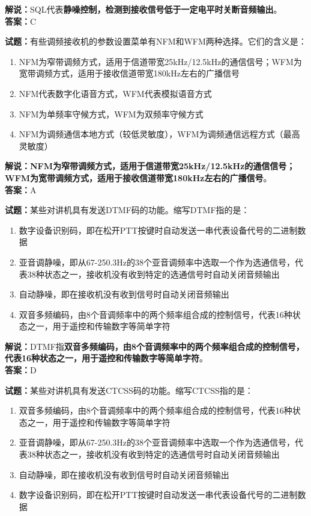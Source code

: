 \documentclass{ctexbook}
\begin{document}
\noindent\textbf{解说：}SQL代表\textbf{静噪控制，检测到接收信号低于一定电平时关断音频输出}。\\\noindent\textbf{答案：}C


\bigskip


\noindent\textbf{试题：}有些调频接收机的参数设置菜单有NFM和WFM两种选择。它们的含义是：

\begin{enumerate}[leftmargin=3em]
	\item NFM为窄带调频方式，适用于信道带宽25kHz/12.5kHz的通信信号；WFM为宽带调频方式，适用于接收信道带宽180kHz左右的广播信号
	\item NFM代表数字化语音方式，WFM代表模拟语音方式
	\item NFM为单频率守候方式，WFM为双频率守候方式
	\item NFM为调频通信本地方式（较低灵敏度），WFM为调频通信远程方式（最高灵敏度）
\end{enumerate}

\noindent\textbf{解说：NFM为窄带调频方式，适用于信道带宽25kHz/12.5kHz的通信信号；WFM为宽带调频方式，适用于接收信道带宽180kHz左右的广播信号}。\\\noindent\textbf{答案：}A


\bigskip


\noindent\textbf{试题：}某些对讲机具有发送DTMF码的功能。缩写DTMF指的是：

\begin{enumerate}[leftmargin=3em]
	\item 数字设备识别码，即在松开PTT按键时自动发送一串代表设备代号的二进制数据
	\item 亚音调静噪，即从67-250.3Hz的38个亚音调频率中选取一个作为选通信号，代表38种状态之一，接收机没有收到特定的选通信号时自动关闭音频输出	
	\item 自动静噪，即在接收机没有收到信号时自动关闭音频输出
	\item 双音多频编码，由8个音调频率中的两个频率组合成的控制信号，代表16种状态之一，用于遥控和传输数字等简单字符
\end{enumerate}

\noindent\textbf{解说：}DTMF指\textbf{双音多频编码，由8个音调频率中的两个频率组合成的控制信号，代表16种状态之一，用于遥控和传输数字等简单字符}。\\\noindent\textbf{答案：}D


\bigskip


\noindent\textbf{试题：}某些对讲机具有发送CTCSS码的功能。缩写CTCSS指的是：

\begin{enumerate}[leftmargin=3em]
	\item 双音多频编码，由8个音调频率中的两个频率组合成的控制信号，代表16种状态之一，用于遥控和传输数字等简单字符
	\item 亚音调静噪，即从67-250.3Hz的38个亚音调频率中选取一个作为选通信号，代表38种状态之一，接收机没有收到特定的选通信号时自动关闭音频输出
	\item 自动静噪，即在接收机没有收到信号时自动关闭音频输出
	\item 数字设备识别码，即在松开PTT按键时自动发送一串代表设备代号的二进制数据
\end{enumerate}
\end{document}

